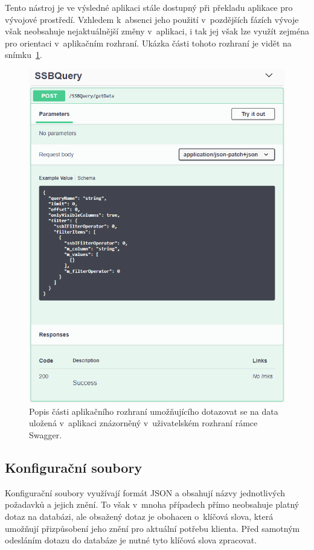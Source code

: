 Tento nástroj je ve výsledné aplikaci stále dostupný při překladu aplikace pro vývojové prostředí. Vzhledem k~absenci jeho použití v~pozdějších fázích vývoje však neobsahuje nejaktuálnější změny v~aplikaci, i tak jej však lze využít zejména pro orientaci v~aplikačním rozhraní. Ukázka části tohoto rozhraní je vidět na snímku~\ref{img:swagger}.

\begin{figure}[H]
	\centering
	\label{img:swagger}
	\includegraphics[width=\textwidth]{obrazky-figures/swagger.png}
	\caption{Popis části aplikačního rozhraní umožňujícího dotazovat se na data uložená v~aplikaci znázorněný v~uživatelském rozhraní rámce Swagger.}
\end{figure}

\subsection{Konfigurační soubory}
Konfigurační soubory využívají formát JSON a obsahují názvy jednotlivých požadavků a jejich znění. To však v~mnoha případech přímo neobsahuje platný dotaz na databázi, ale obsažený dotaz je obohacen o~klíčová slova, která umožňují přizpůsobení jeho znění pro aktuální potřebu klienta. Před samotným odesláním dotazu do databáze je nutné tyto klíčová slova zpracovat.


